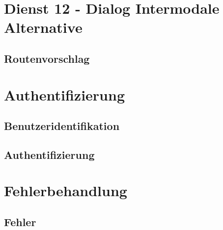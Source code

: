 \section{Dienst 12 - Dialog Intermodale Alternative}
\label{sec:Datenmodell:Dienst12}

\subsection*{Routenvorschlag}



\section{Authentifizierung}
\label{sec:Datenmodell:Auth}

\subsection*{Benutzeridentifikation}



\subsection*{Authentifizierung}




\section{Fehlerbehandlung}
\subsection*{Fehler}


